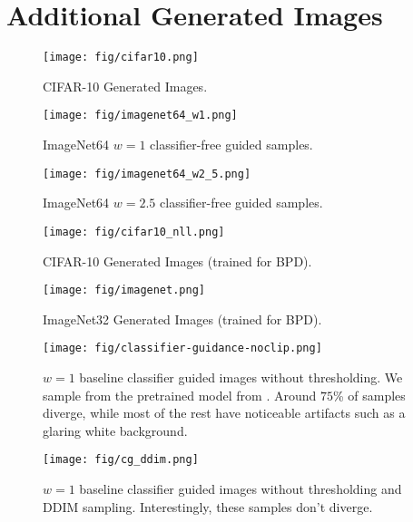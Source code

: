 \documentclass{article}
\theoremstyle{plain}
\theoremstyle{definition}
\theoremstyle{remark}
\begin{document}
 \newpage

\section{Additional Generated Images}\label{sec:app:fig}

\begin{figure}[H]
    \centering
    \texttt{[image: fig/cifar10.png]}
    \caption{CIFAR-10 Generated Images.}
\end{figure}

\begin{figure}[H]
    \centering
    \texttt{[image: fig/imagenet64\_w1.png]}
    \caption{ImageNet64 $w=1$ classifier-free guided samples.}
\end{figure}

\begin{figure}[H]
    \centering
    \texttt{[image: fig/imagenet64\_w2\_5.png]}
    \caption{ImageNet64 $w=2.5$ classifier-free guided samples.}
\end{figure}

\begin{figure}[H]
    \centering
    \texttt{[image: fig/cifar10\_nll.png]}
    \caption{CIFAR-10 Generated Images (trained for BPD).}
\end{figure}

\begin{figure}[H]
    \centering
    \texttt{[image: fig/imagenet.png]}
    \caption{ImageNet32 Generated Images (trained for BPD).}
\end{figure}

\begin{figure}[H]
    \centering
    \texttt{[image: fig/classifier-guidance-noclip.png]}
    \caption{$w=1$ baseline classifier guided images without thresholding. We sample from the pretrained model from \citet{Dhariwal2021DiffusionMB}. Around $75$\% of samples diverge, while most of the rest have noticeable artifacts such as a glaring white background.}\label{fig:cl_guidance_noclip}
\end{figure}

\begin{figure}[H]
    \centering
    \texttt{[image: fig/cg\_ddim.png]}
    \caption{$w=1$ baseline classifier guided images without thresholding and DDIM sampling. Interestingly, these samples don't diverge.}\label{fig:cg_ddim}
\end{figure}
\end{document}
